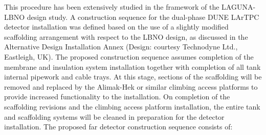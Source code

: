 This procedure has been extensively studied in the framework of the
LAGUNA-LBNO design study. A construction sequence for the dual-phase
DUNE LArTPC detector installation was defined based on the use of a
slightly modified scaffolding arrangement with respect to the LBNO
design, as discussed in the Alternative Design Installation Annex
(Design: courtesy Technodyne Ltd., Eastleigh, UK). The proposed
construction sequence assumes completion of the membrane and
insulation system installation together with completion of all tank
internal pipework and cable trays.  At this stage, sections of the
scaffolding will be removed and replaced by the Alimak-Hek or similar
climbing access platforms to provide increased functionality to the
installation.  On completion of the scaffolding revisions and the
climbing access platform installation, the entire tank and scaffolding
systems will be cleaned in preparation for the detector
installation. The proposed far detector construction sequence consists
of:
